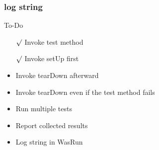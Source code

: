 \documentclass[lualatex]{beamer}
\begin{document}
\begin{frame}
  \frametitle{log string}

  \begin{block}{To-Do}
    \begin{itemize}
    \item[$\surd$] Invoke test method
    \item[$\surd$] Invoke setUp first 
    \item Invoke tearDown afterward 
    \item Invoke tearDown even if the test method fails 
    \item Run multiple tests 
    \item Report collected results 
    \item Log string in WasRun 
    \end{itemize}
  \end{block}
\end{frame}
\end{document}

